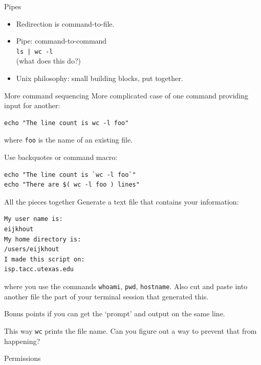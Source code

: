\documentclass[11pt,headernav]{beamer}
\begin{document}
\begin{numberedframe}{Pipes}
  \label{sl-lnx:pipe}
  \begin{itemize}
  \item Redirection is command-to-file.
  \item Pipe: command-to-command\\
    \lstinline{ls | wc -l}\\
    (what does this do?)
  \item Unix philosophy: small building blocks, put together.
  \end{itemize}
\end{numberedframe}

\begin{numberedframe}{More command sequencing}
  \label{sl-lnx:backtick}
  More complicated case of one command providing input for another:
\begin{lstlisting}
echo "The line count is wc -l foo"
\end{lstlisting}
where \lstinline{foo} is the name of an existing file.

Use backquotes or command macro:
\begin{lstlisting}
echo "The line count is `wc -l foo`"
echo "There are $( wc -l foo ) lines"
\end{lstlisting}
\end{numberedframe}

\begin{exerciseframe}{All the pieces together}
  Generate a text file that contains your information:
\begin{lstlisting}
My user name is:
eijkhout
My home directory is:
/users/eijkhout
I made this script on:
isp.tacc.utexas.edu
\end{lstlisting}
where you use the commands \lstinline{whoami}, \lstinline{pwd}, \lstinline{hostname}.
Also cut and paste into another file the part of your terminal session that
generated this.

Bonus points if you can get the `prompt' and output on the same line.
\end{exerciseframe}

\begin{exerciseframe}{}
  This way \lstinline{wc} prints the file name.
  Can you figure out a way to prevent that from happening?
\end{exerciseframe}

 {Permissions}
\end{document}
